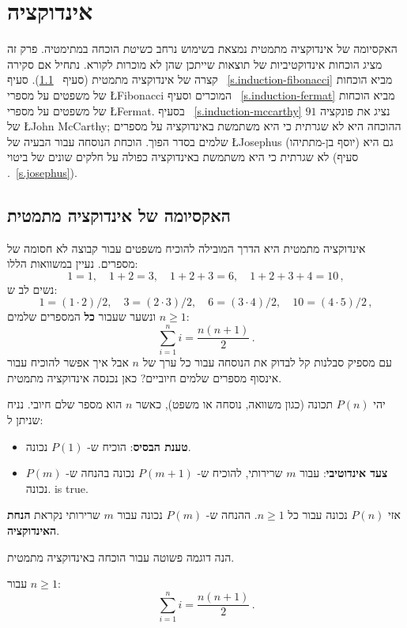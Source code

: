

\chapter{אינדוקציה}\label{c.induction}


האקסיומה של אינדוקציה מתמטית נמצאת בשימוש נרחב כשיטת הוכחה במתימטיה. פרק זה מציג הוכחות אינדוקטיביות של תוצאות שייתכן שהן לא מוכרות לקורא. נתחיל אם סקירה קצרה של אינדוקציה מתמטית (סעיף%
~\ref{s.induction-axiom}).
סעיף%
~\ref{s.induction-fibonacci}
מביא הוכחות של משפטים על מספרי
\L{Fibonacci}
המוכרים וסעיף%
~\ref{s.induction-fermat}
מביא הוכחות של משפטים על מספרי
\L{Fermat}.
בסעיף%
~\ref{s.induction-mccarthy}
נציג את פונקציה 
$91$
של 
\L{John McCarthy};
ההוכחה היא לא שגרתית כי היא משתמשת באינדוקציה על מספרים שלמים בסדר הפוך. הוכחת הנוסחה עבור הבעיה של
\L{Josephus}
(יוסף בן-מתתיהו) גם היא לא שגרתית כי היא משתמשת באינדוקציה כפולה על חלקים שונים של ביטוי (סעיף%
.~\ref{s.josephus}).

\section{האקסיומה של אינדוקציה מתמטית}\label{s.induction-axiom}

אינדוקציה מתמטית היא הדרך המובילה להוכיח משפטים עבור קבוצה לא חסומה של מספרים. נעיין במשוואות הללו:
\[
1=1,\quad 1+2=3,\quad 1+2+3=6,\quad 1+2+3+4=10\,,
\]
נשים לב ש:
\[
1=(1\cdot 2)/2,\quad 3=(2\cdot 3)/2,\quad  6=(3\cdot 4)/2,\quad 10=(4\cdot 5)/2\,,
\]
ונשער שעבור
\textbf{כל}
המספרים שלמים
$n\geq 1$:
\[
\sum_{i=1}^n i = \frac{n(n+1)}{2}\,.
\]
עם מספיק סבלנות קל לבדוק את הנוסחה עבור כל ערך של
$n$
אבל איך אפשר להוכיח עבור אינסוף מספרים שלמים חיוביים? כאן נכנסה אינדוקציה מתמטית.

\begin{axiom}
יהי
$P(n)$
תכונה (כגון משוואה, נוסחה או משפט), כאשר 
$n$
הוא מספר שלם חיובי. נניח שניתן ל:
\begin{itemize}
\item \textbf{טענת הבסיס}: 
הוכיח ש-%
$P(1)$
נכונה.
\item \textbf{צעד אינדוטיבי}:
עבור 
$m$
שרירותי, להוכיח ש-%
$P(m+1)$
נכונה בהנחה ש-%
$P(m)$
נכונה.
 is true.
\end{itemize}
אזי
$P(n)$
נכונה עבור כל
$n\geq 1$.
ההנחה ש-%
$P(m)$
נכונה עבור 
$m$ 
שרירותי נקראת
\textbf{הנחת האינדוקציה}.
\end{axiom}
הנה דוגמה פשוטה עבור הוכחה באינדוקציה מתמטית.
\begin{theorem}\label{t.sum}
עבור
$n\geq 1$:
\[
\sum_{i=1}^n i = \frac{n(n+1)}{2}\,.
\]
\end{theorem}

